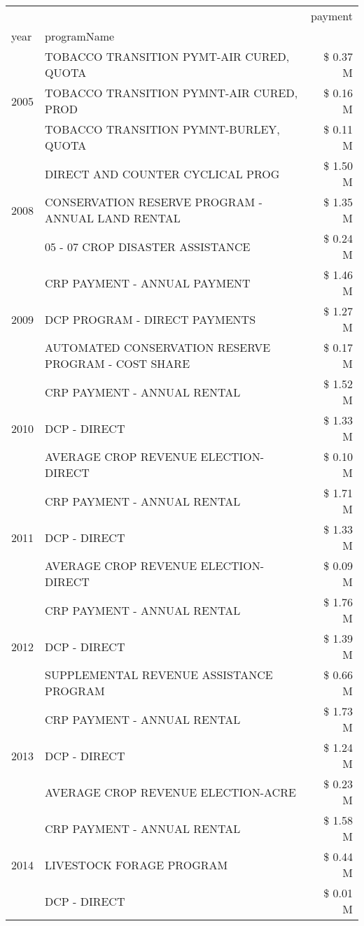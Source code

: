 \begin{tabular}{llr}
\toprule
 &  & payment \\
year & programName &  \\
\midrule
\multirow[t]{3}{*}{2005} & TOBACCO TRANSITION PYMT-AIR CURED, QUOTA & \$ 0.37 M \\
 & TOBACCO TRANSITION PYMNT-AIR CURED, PROD & \$ 0.16 M \\
 & TOBACCO TRANSITION PYMNT-BURLEY, QUOTA & \$ 0.11 M \\
\cline{1-3}
\multirow[t]{3}{*}{2008} & DIRECT AND COUNTER CYCLICAL PROG & \$ 1.50 M \\
 & CONSERVATION RESERVE PROGRAM - ANNUAL LAND RENTAL & \$ 1.35 M \\
 & 05 - 07 CROP DISASTER ASSISTANCE & \$ 0.24 M \\
\cline{1-3}
\multirow[t]{3}{*}{2009} & CRP PAYMENT - ANNUAL PAYMENT & \$ 1.46 M \\
 & DCP PROGRAM - DIRECT PAYMENTS & \$ 1.27 M \\
 & AUTOMATED CONSERVATION RESERVE PROGRAM - COST SHARE & \$ 0.17 M \\
\cline{1-3}
\multirow[t]{3}{*}{2010} & CRP PAYMENT - ANNUAL RENTAL & \$ 1.52 M \\
 & DCP - DIRECT & \$ 1.33 M \\
 & AVERAGE CROP REVENUE ELECTION-DIRECT & \$ 0.10 M \\
\cline{1-3}
\multirow[t]{3}{*}{2011} & CRP PAYMENT - ANNUAL RENTAL & \$ 1.71 M \\
 & DCP - DIRECT & \$ 1.33 M \\
 & AVERAGE CROP REVENUE ELECTION-DIRECT & \$ 0.09 M \\
\cline{1-3}
\multirow[t]{3}{*}{2012} & CRP PAYMENT - ANNUAL RENTAL & \$ 1.76 M \\
 & DCP - DIRECT & \$ 1.39 M \\
 & SUPPLEMENTAL REVENUE ASSISTANCE PROGRAM & \$ 0.66 M \\
\cline{1-3}
\multirow[t]{3}{*}{2013} & CRP PAYMENT - ANNUAL RENTAL & \$ 1.73 M \\
 & DCP - DIRECT & \$ 1.24 M \\
 & AVERAGE CROP REVENUE ELECTION-ACRE & \$ 0.23 M \\
\cline{1-3}
\multirow[t]{3}{*}{2014} & CRP PAYMENT - ANNUAL RENTAL & \$ 1.58 M \\
 & LIVESTOCK FORAGE PROGRAM & \$ 0.44 M \\
 & DCP - DIRECT & \$ 0.01 M \\
\cline{1-3}

\end{tabular}

